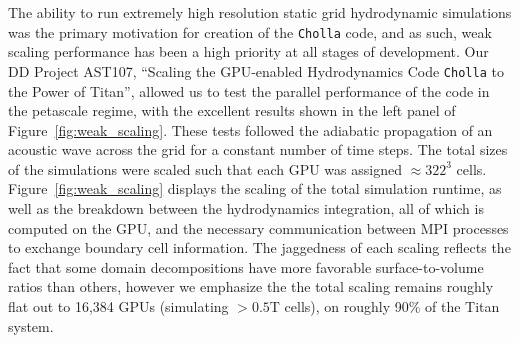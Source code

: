 \documentclass[11pt,letterpaper,english]{article}
\begin{document}



The ability to run extremely high resolution static grid hydrodynamic simulations was the primary motivation for creation of the {\tt Cholla} code, and as such, weak scaling performance has been a high priority at all stages of development. Our DD Project AST107, ``Scaling the GPU-enabled Hydrodynamics Code {\tt Cholla} to the Power of Titan'', allowed us to test the parallel performance of the code in the petascale regime, with the excellent results shown in the left panel of Figure~\ref{fig:weak_scaling}. These tests followed the adiabatic propagation of an acoustic wave across the grid for a constant number of time steps. The total sizes of the simulations were scaled such that each GPU was assigned $\approx 322^3$ cells. Figure~\ref{fig:weak_scaling} displays the scaling of the total simulation runtime, as well as the breakdown between the hydrodynamics integration, all of which is computed on the GPU, and the necessary communication between MPI processes to exchange boundary cell information. The jaggedness of each scaling reflects the fact that some domain decompositions have more favorable surface-to-volume ratios than others, however we emphasize the the total scaling remains roughly flat out to 16,384 GPUs (simulating $>0.5$T cells), on roughly 90\% of the Titan system.
\end{document}
